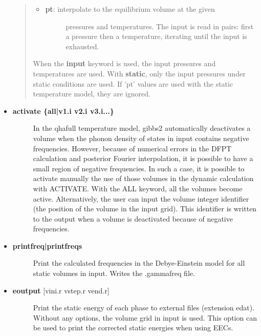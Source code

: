 \documentclass[a4paper]{article}
\begin{document}
\begin{itemize}
\begin{quote}
\begin{itemize}
\begin{description}
\end{description}

\item %
\begin{description}
\item[{\textbf{pt}: interpolate to the equilibrium volume at the given}] \leavevmode 
pressures and temperatures. The input is read in pairs:
first a pressure then a temperature, iterating until the
input is exhausted.

\end{description}

\end{itemize}

When the \textbf{input} keyword is used, the input pressures and
temperatures are used. With \textbf{static}, only the input pressures
under static conditions are used. If 'pt' values are used with
the static temperature model, they are ignored.

\end{quote}

\item %
\begin{description}
\item[{\textbf{activate \{all|v1.i v2.i v3.i...\}}}] \leavevmode 
In the qhafull temperature model, gibbs2 automatically deactivates
a volume when the phonon density of states in input contains
negative frequencies. However, because of numerical errors in the
DFPT calculation and posterior Fourier interpolation, it is
possible to have a small region of negative frequencies. In such a
case, it is possible to activate manually the use of those volumes
in the dynamic calculation with ACTIVATE. With the ALL keyword, all
the volumes become active. Alternatively, the user can input the
volume integer identifier (the position of the volume in the input
grid). This identifier is written to the output when a volume is
deactivated because of negative frequencies.

\end{description}

\item %
\begin{description}
\item[{\textbf{printfreq|printfreqs}}] \leavevmode 
Print the calculated frequencies in the Debye-Einstein model for
all static volumes in input. Writes the .gammafreq file.

\end{description}

\item %
\begin{description}
\item[{\textbf{eoutput} {[}vini.r vstep.r vend.r{]}}] \leavevmode 
Print the static energy of each phase to external files (extension
edat). Without any options, the volume grid in input is used. This
option can be used to print the corrected static energies when
using EECs.


\end{description}
\end{itemize}
\end{document}
